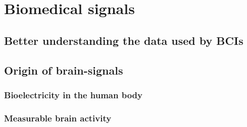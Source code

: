 


\glsresetall

\chapter{Biomedical signals}
\label{ch:biomedical_signals}


\section{Better understanding the data used by BCIs}
\label{sec:biomedical_signals_why}

\lipsum[1-2]


\section{Origin of brain-signals}
\label{sec:biomedical_signals_origin}

\lipsum[1-2]


\subsection{Bioelectricity in the human body}
\label{subsec:biomedical_signals_origin_bioelectricity}

\lipsum[1-4]


\subsection{Measurable brain activity}
\label{subsec:biomedical_signals_origin_brain_activity}

